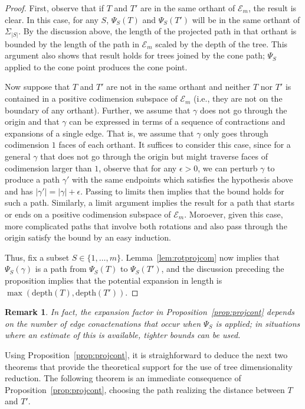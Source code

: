\documentclass[a4paper,11pt]{article}
\newtheorem{remark}[theorem]{Remark}
\newcommand{\aE}{\mathcal{E}}
\newcommand{\depth}{\textrm{depth}}
\begin{document}
\begin{proof}
First, observe that if $T$ and $T'$ are in the same orthant of $\aE_m$, the result is clear.
In this case, for any $S$, $\Psi_S(T)$ and $\Psi_S(T')$ will be in the same orthant of $\Sigma_{|S|}$.
By the discussion above, the length of the projected path in that orthant is bounded by the length of the path in $\aE_m$ scaled by the depth of the tree.
This argument also shows that result holds for trees joined by the cone path; $\Psi_S$ applied to the cone point produces the cone point.

Now suppose that $T$ and $T'$ are not in the same orthant and neither $T$ nor $T'$ is contained in a positive codimension subspace of $\aE_m$ (i.e., they are not on the boundary of any orthant).
Further, we assume that $\gamma$ does not go through the origin and that $\gamma$ can be expressed in terms of a sequence of contractions and expansions of a single edge.
That is, we assume that $\gamma$ only goes through codimension $1$ faces of each orthant.
It suffices to consider this case, since for a general $\gamma$ that does not go through the origin but might traverse faces of codimension larger than $1$, observe that for any $\epsilon > 0$, we can perturb $\gamma$ to produce a path $\gamma'$ with the same endpoints which satisfies the hypothesis above and has $|\gamma'| = |\gamma| + \epsilon$.
Passing to limits then implies that the bound holds for such a path.
Similarly, a limit argument implies the result for a path that starts or ends on a positive codimension subspace of $\aE_m$.
Moroever, given this case, more complicated paths that involve both rotations and also pass through the origin satisfy the bound by an easy induction.

Thus, fix a subset $S \in \{1,\ldots,m\}$.
Lemma~\ref{lem:rotprojcom} now implies that $\Psi_S(\gamma)$ is a path from $\Psi_S(T)$ to $\Psi_S(T')$, and the discussion preceding the proposition implies that the potential expansion in length is $\max(\depth(T),\depth(T'))$.
\end{proof}

\begin{remark}
In fact, the expansion factor in Proposition~\ref{prop:projcont} depends on the number of edge conactenations that occur when $\Psi_S$ is applied; in situations where an estimate of this is available, tighter bounds can be used.
\end{remark}

Using Proposition~\ref{prop:projcont}, it is straighforward to deduce the next two theorems that provide the theoretical support for the use of tree dimensionality reduction.
The following theorem is an immediate consequence of Proposition~\ref{prop:projcont}, choosing the path realizing the distance between $T$ and $T'$.
\end{document}
